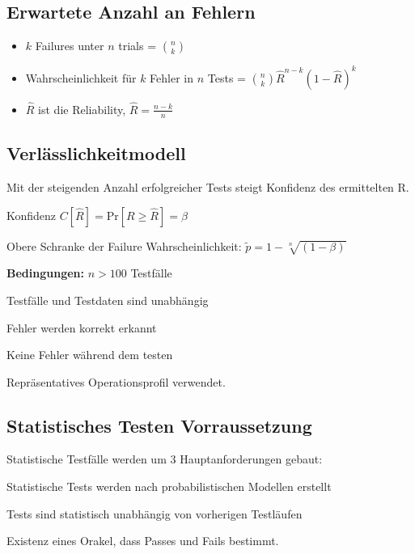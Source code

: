 \subsection{Erwartete Anzahl an Fehlern}
\label{sub:Erwartete Anzahl an Fehlern}

\begin{itemize}
    \item $k$ Failures unter $n$ trials = $\binom{n}{k}$
    \item Wahrscheinlichkeit für $k$ Fehler in $n$ Tests = $\binom{n}{k}\hat{R}^{n-k}(1-\hat{R})^k$
    \item $\hat{R}$ ist die Reliability, $\hat{R} = \frac{n-k}{n}$
\end{itemize}

\subsection{Verlässlichkeitmodell}
\begin{compactitem}
    \item Mit der steigenden Anzahl erfolgreicher Tests steigt Konfidenz des ermittelten R.
    \item Konfidenz $C[\hat{R}] = \text{Pr}[R \geq \hat{R}] = \beta$
    \item Obere Schranke der Failure Wahrscheinlichkeit: $\tilde{p} = 1 - \sqrt[n]{(1- \beta)}$
    \begin{compactitem}
        \item \textbf{Bedingungen:} $n > 100$ Testfälle
        \item Testfälle und Testdaten sind unabhängig
        \item Fehler werden korrekt erkannt
        \item Keine Fehler während dem testen
        \item Repräsentatives Operationsprofil verwendet.
    \end{compactitem}
\end{compactitem}

\subsection{Statistisches Testen Vorraussetzung}
Statistische Testfälle werden um 3 Hauptanforderungen gebaut:
\begin{compactitem}
    \item Statistische Tests werden nach probabilistischen Modellen erstellt
    \item Tests sind statistisch unabhängig von vorherigen Testläufen
    \item Existenz eines Orakel, dass Passes und Fails bestimmt.
\end{compactitem}
